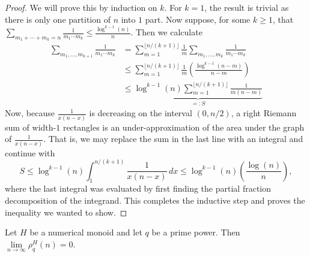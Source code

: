\begin{proof}
	We will prove this by induction on $k$.
	For $k=1$, the result is trivial as there is only one partition of $n$ into $1$ part.
	Now suppose, for some $k\ge 1$, that $\sum_{m_1+\cdots+m_k=n} \frac{1}{m_1\cdots m_k} \le \frac{\log^{k-1}(n)}{n}$.
	Then we calculate
	\begin{align*}
	\sum_{m_1,\dots,m_{k+1}} \frac{1}{m_1\cdots m_k} 
	&= \sum_{m=1}^{\lfloor n/(k+1) \rfloor} \frac{1}{m} \sum_{m_1,\dots,m_k} \frac{1}{m_1\cdots m_k} \tag{inner sum taken over partitions of $n-m$}\\
	&\le \sum_{m=1}^{\lfloor n/(k+1)\rfloor} \frac{1}{m} \left( \frac{\log^{k-1}(n-m)}{n-m} \right) \\
	&\le \underbrace{\log^{k-1}(n) \sum_{m=1}^{\lfloor n/(k+1)\rfloor} \frac{1}{m(n-m)}}_{=:S}
	\end{align*}
	Now, because $\frac{1}{x(n-x)}$ is decreasing on the interval $(0,n/2)$, a right Riemann sum of width-$1$ rectangles is an under-approximation of the area under the graph of $\frac{1}{x(n-x)}$.
	That is, we may replace the sum in the last line with an integral and continue with
	\[
	S \le \log^{k-1}(n) \int_1^{n/(k+1)} \frac{1}{x(n-x)} \, dx 
	\le \log^{k-1}(n) \left(\frac{\log(n)}{n}\right),
	\]
	where the last integral was evaluated by first finding the partial fraction decomposition of the integrand.
	This completes the inductive step and proves the inequality we wanted to show.
\end{proof}

\begin{thm}
	Let $H$ be a numerical monoid and let $q$ be a prime power.
	Then $\lim\limits_{n\to\infty} \rho_q^H(n) = 0$.
\end{thm}

